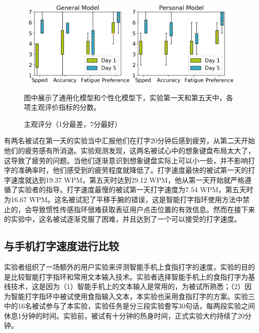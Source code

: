\begin{figure}[!htbp]
	\centering
	\includegraphics[width=1.0\linewidth]{figures/QwertyRing_subjective.png}
	\caption*{图中展示了通用化模型和个性化模型下，实验第一天和第五天中，各项主观评价指标的分数。}
	\caption{主观评分（1分最差，7分最好）}
	\label{fig:QwertyRing_subjective}
\end{figure}

有两名被试在第一天的实验当中汇报他们在打字20分钟后感到疲劳，从第二天开始他们的疲劳感有所消退。实验观测发现，这两名被试心中的想象键盘布局太大了，这导致了疲劳的问题。当他们逐渐意识到想象键盘实际上可以小一些，并不影响打字的准确率时，他们感受到的疲劳程度就降低了。打字速度最快的被试第一天的打字速度就达到19.37 WPM，第五天时达到29.12 WPM，他从第一天开始就严格遵循了实验者的指导。打字速度最慢的被试第一天打字速度为7.54 WPM，第五天时为16.67 WPM。这名被试犯了平移手腕的错误，这是智能打字指环使用方法中禁止的，会导致惯性传感指环很难获取表征用户点击位置的有效信息。然而在接下来的实验中，这名被试逐渐克服了困难，并且达到了一个可以接受的打字速度。

\subsection{与手机打字速度进行比较}

实验者组织了一场额外的用户实验来评测智能手机上食指打字的速度，实验的目的是比较智能打字指环和常用文本输入技术。实验者选择智能手机上的食指打字为基线技术，这是因为（1）智能手机上的文本输入是常用的，为被试所熟悉；（2）因为智能打字指环中被试使用食指输入文本，本实验也采用食指打字的方案。实验三中的16名被试参与了本实验，实验任务是分三段实验誊写30句话，每两段实验之间休息1分钟的时间。实验前，被试有十分钟的热身时间，正式实验大约持续了20分钟。

